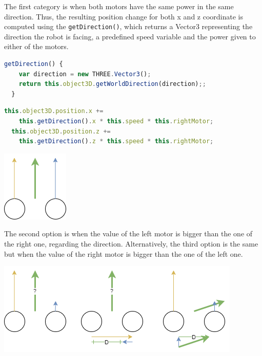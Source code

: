 \documentclass{scrreprt}
\begin{document}
The first category is when both motors have the same power in the same direction. Thus, the resulting position change for both x and z coordinate is computed using the \texttt{getDirection()}, which returns 
a Vector3 representing the direction the robot is facing, a predefined speed variable and the power given to either of the motors.

\begin{lstlisting}[language=JavaScript, gobble=2, basicstyle=\ttfamily\small]
  getDirection() {
    var direction = new THREE.Vector3();
    return this.object3D.getWorldDirection(direction);;
  }
\end{lstlisting} 

\begin{lstlisting}[language=JavaScript, gobble=2, basicstyle=\ttfamily\small]
  this.object3D.position.x += 
    this.getDirection().x * this.speed * this.rightMotor;
  this.object3D.position.z +=
    this.getDirection().z * this.speed * this.rightMotor;
\end{lstlisting}  

\begin{center}
  \includegraphics[scale=0.8]{./move_spsd}
\end{center}

The second option is when the value of the left motor is bigger than the one of the right one, regarding the direction. Alternatively, the third option is the same but when the value of the right motor is bigger than the one of the left one.

\begin{center}
  \includegraphics[width=\textwidth]{./move_dp}
\end{center}
\end{document}
